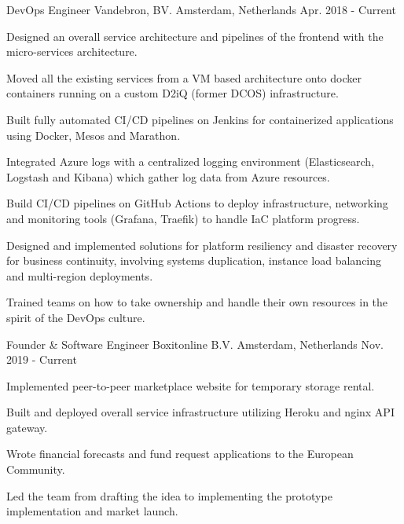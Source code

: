 

\begin{cventries}

  \cventry
    {DevOps Engineer} %
    {Vandebron, BV.} %
    {Amsterdam, Netherlands} %
    {Apr. 2018 - Current} %
    {
      \begin{cvitems} %
        \item {Designed an overall service architecture and pipelines of the frontend with the micro-services architecture.}
        \item {Moved all the existing services from a VM based architecture onto docker containers running on a custom D2iQ (former DCOS) infrastructure.}
        \item {Built fully automated CI/CD pipelines on Jenkins for containerized applications using Docker, Mesos and Marathon.}
        \item {Integrated Azure logs with a centralized logging environment (Elasticsearch, Logstash and Kibana) which gather log data from Azure resources.}
        \item {Build CI/CD pipelines on GitHub Actions to deploy infrastructure, networking and monitoring tools (Grafana, Traefik) to handle IaC platform progress.}
        \item {Designed and implemented solutions for platform resiliency and disaster recovery for business continuity, involving systems duplication, instance load balancing and multi-region deployments.}
        \item {Trained teams on how to take ownership and handle their own resources in the spirit of the DevOps culture.}
      \end{cvitems}
    }

  \cventry
    {Founder \& Software Engineer} %
    {Boxitonline B.V.} %
    {Amsterdam, Netherlands} %
    {Nov. 2019 - Current} %
    {
      \begin{cvitems} %
        \item {Implemented peer-to-peer marketplace website for temporary storage rental.}
        \item {Built and deployed overall service infrastructure utilizing Heroku and nginx API gateway.}
        \item {Wrote financial forecasts and fund request applications to the European Community.}
        \item {Led the team from drafting the idea to implementing the prototype implementation and market launch.}
      \end{cvitems}  
    }  
      

\end{cventries}
